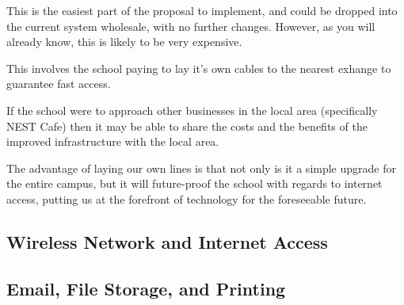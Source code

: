 \documentclass[a4paper,leqno,titlepage]{article}
\begin{document}

This is the easiest part of the proposal to implement, and could be dropped
into the current system wholesale, with no further changes. However, as you will
already know, this is likely to be very expensive.


This involves the school paying to lay it's own cables to the nearest exhange
to guarantee fast access.


If the school were to approach other businesses in the local area (specifically
NEST Cafe) then it may be able to share the costs and the benefits of the
improved infrastructure with the local area.


The advantage of laying our own lines is that not only is it a simple upgrade
for the entire campus, but it will future-proof the school with regards to
internet access, putting us at the forefront of technology for the foreseeable
future.




\subsection{Wireless Network and Internet Access}




\subsection{Email, File Storage, and Printing}


\end{document}
